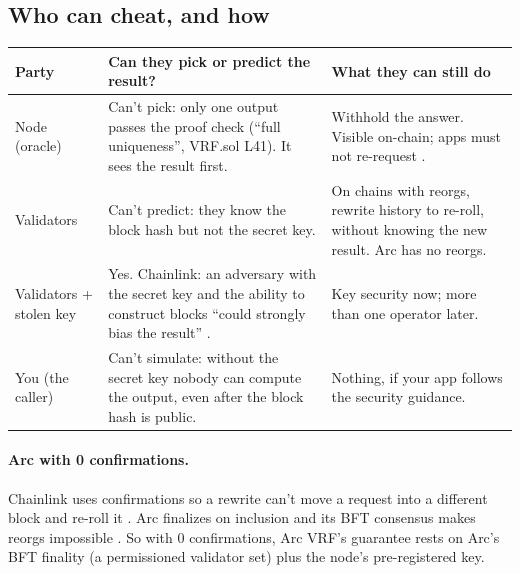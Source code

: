 \documentclass[11pt,a4paper]{article}
\begin{document}
\subsection{Who can cheat, and how}
{\small
\begin{tabularx}{\textwidth}{P{2.6cm}LL}
\toprule
Party & Can they pick or predict the result? & What they can still do\\
\midrule
Node (oracle) & Can't pick: only one output passes the proof check (``full uniqueness'', VRF.sol L41). It sees the result first. & Withhold the answer. Visible on-chain; apps must not re-request \cite{clsecurity}.\\
Validators & Can't predict: they know the block hash but not the secret key. & On chains with reorgs, rewrite history to re-roll, without knowing the new result. Arc has no reorgs.\\
Validators + stolen key & Yes. Chainlink: an adversary with the secret key and the ability to construct blocks ``could strongly bias the result'' \cite{clvrf}. & Key security now; more than one operator later.\\
You (the caller) & Can't simulate: without the secret key nobody can compute the output, even after the block hash is public. & Nothing, if your app follows the security guidance.\\
\bottomrule
\end{tabularx}}

\paragraph{Arc with 0 confirmations.} Chainlink uses confirmations so a rewrite can't move a request into a different block and re-roll it \cite{clsecurity}. Arc finalizes on inclusion and its BFT consensus makes reorgs impossible \cite{arcconsensus}. So with 0 confirmations, Arc VRF's guarantee rests on Arc's BFT finality (a permissioned validator set) plus the node's pre-registered key.
\end{document}
